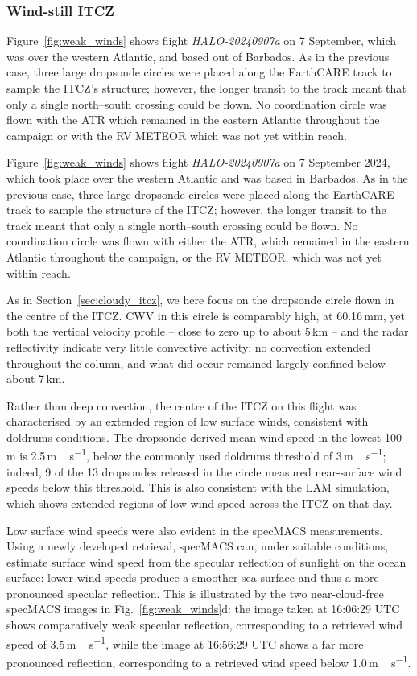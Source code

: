 \documentclass[acp, manuscript]{copernicus}
\begin{document}
\subsubsection{Wind-still ITCZ}
Figure~\ref{fig:weak_winds} shows flight \textit{HALO-20240907a} on 7 September, which was over the western Atlantic, and based out of Barbados. As in the previous case, three large dropsonde circles were placed along the EarthCARE track to sample the ITCZ's structure; however, the longer transit to the track meant that only a single north--south crossing could be flown. No coordination circle was flown with the ATR which remained in the eastern Atlantic throughout the campaign or with the RV METEOR which was not yet within reach.

Figure~\ref{fig:weak_winds} shows flight \textit{HALO-20240907a} on 7 September 2024, which took place over the western Atlantic and was based in Barbados. As in the previous case, three large dropsonde circles were placed along the EarthCARE track to sample the structure of the ITCZ; however, the longer transit to the track meant that only a single north--south crossing could be flown. No coordination circle was flown with either the ATR, which remained in the eastern Atlantic throughout the campaign, or the RV METEOR, which was not yet within reach.

As in Section~\ref{sec:cloudy_itcz}, we here focus on the dropsonde circle flown in the centre of the ITCZ. CWV in this circle is comparably high, at 60.16\,\unit{mm}, yet both the vertical velocity profile -- close to zero up to about 5\,\unit{km} -- and the radar reflectivity indicate very little convective activity: no convection extended throughout the column, and what did occur remained largely confined below about 7\,\unit{km}.

Rather than deep convection, the centre of the ITCZ on this flight was characterised by an extended region of low surface winds, consistent with doldrums conditions. The dropsonde-derived mean wind speed in the lowest 100\,\unit{m} is 2.5\,\unit{m\,s^{-1}}, below the commonly used doldrums threshold of 3\,\unit{m\,s^{-1}}; indeed, 9 of the 13 dropsondes released in the circle measured near-surface wind speeds below this threshold. This is also consistent with the LAM simulation, which shows extended regions of low wind speed across the ITCZ on that day. 

Low surface wind speeds were also evident in the specMACS measurements. Using a newly developed retrieval, specMACS can, under suitable conditions, estimate surface wind speed from the specular reflection of sunlight on the ocean surface: lower wind speeds produce a smoother sea surface and thus a more pronounced specular reflection. This is illustrated by the two near-cloud-free specMACS images in Fig.~\ref{fig:weak_winds}d: the image taken at 16:06:29 UTC shows comparatively weak specular reflection, corresponding to a retrieved wind speed of 3.5\,\unit{m\,s^{-1}}, while the image at 16:56:29 UTC shows a far more pronounced reflection, corresponding to a retrieved wind speed below 1.0\,\unit{m\,s^{-1}}.
\end{document}
